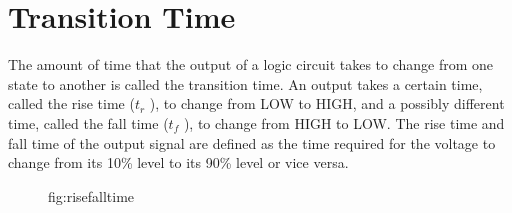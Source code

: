 \section{Transition Time}

The amount of time that the output of a logic circuit 
takes to change from one
state to another is called the transition time. 
An output takes a certain time, called the rise time
($t_r$ ), to change from LOW to HIGH, and a 
possibly different time, called the fall
time ($t_f$ ), to change from HIGH to LOW.
The rise time and fall time of the output signal are defined as the time 
required for the voltage to change from its 10\% level to its 90\% level 
or vice versa. 

\begin{figure}
    \centering 
    \label{Rise and Fall Time}
    \caption{fig:risefalltime}
\end{figure}